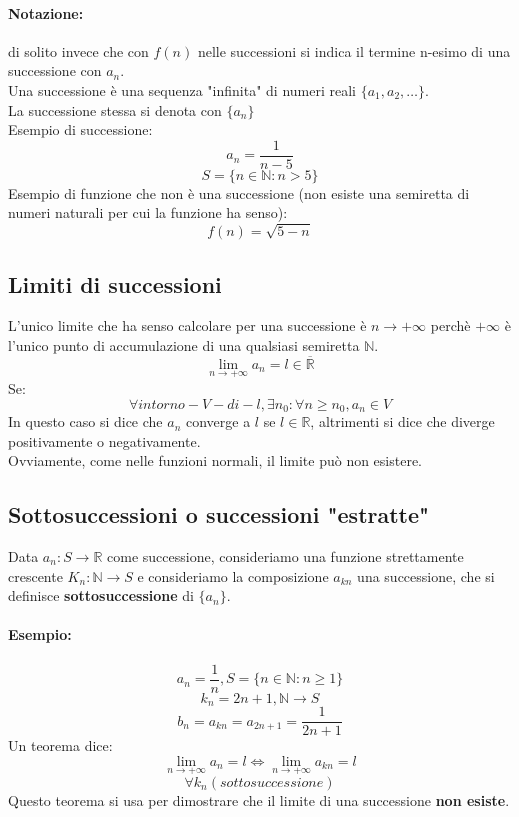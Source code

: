 \documentclass[12pt,a4paper]{article}
\begin{document}
\paragraph{Notazione:} di solito invece che con $f(n)$ nelle successioni si indica il termine n-esimo di una successione con $a_n$.\\
Una successione è una sequenza "infinita" di numeri reali $\{a_1, a_2, \ldots\}$.\\
La successione stessa si denota con $\{a_n\}$\\
Esempio di successione:
\[
a_n = \frac{1}{n-5}
\]
\[
S = \{n \in \mathbb{N} : n > 5\}
\]
Esempio di funzione che non è una successione (non esiste una semiretta di numeri naturali per cui la funzione ha senso):
\[
f(n) = \sqrt{5-n} 
\]
\subsection{Limiti di successioni}
L'unico limite che ha senso calcolare per una successione è $n \to +\infty$ perchè $+\infty$ è l'unico punto di accumulazione di una qualsiasi semiretta $\mathbb{N}$.
\[
\lim_{n \to +\infty} a_n = l \in \overline{\mathbb{R}}
\]
Se:
\[
\forall intorno-V-di-l, \exists n_0 : \forall n \geq n_0, a_n \in V
\]
In questo caso si dice che $a_n$ converge a $l$ se $l \in \mathbb{R}$, altrimenti si dice che diverge positivamente o negativamente.\\
Ovviamente, come nelle funzioni normali, il limite può non esistere.\\
\subsection{Sottosuccessioni o successioni "estratte"}
Data $a_n:S \to \mathbb{R}$ come successione, consideriamo una funzione strettamente crescente $K_n:\mathbb{N} \to S$ e consideriamo la composizione $a_{kn}$ una successione, che si definisce \textbf{sottosuccessione} di $\{a_n\}$.\\
\paragraph{Esempio:}
\[
a_n = \frac{1}{n}, S = \{n \in \mathbb{N} : n \geq 1\}
\]
\[
k_n = 2n + 1, \mathbb{N} \to S
\]
\[
b_n = a_{kn} = a_{2n + 1} = \frac{1}{2n + 1}
\]
Un teorema dice:
\[
\lim_{n \to +\infty} a_n = l \Leftrightarrow \lim_{n \to +\infty} a_{kn} = l
\]
\[
\forall k_n(sottosuccessione)
\]
Questo teorema si usa per dimostrare che il limite di una successione \textbf{non esiste}.
\end{document}
